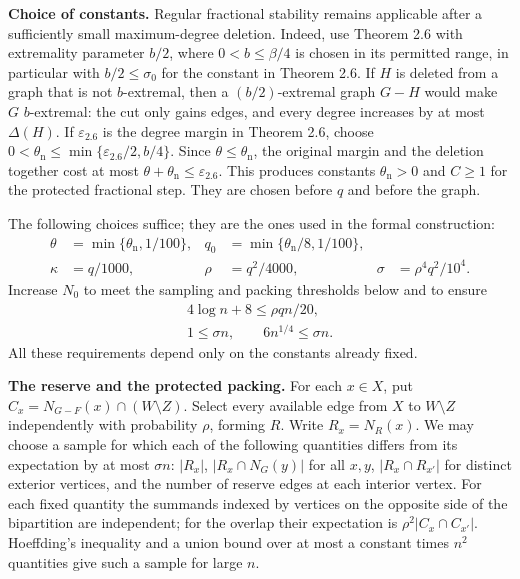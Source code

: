\documentclass[english,11pt,a4paper]{article}
\begin{document}
\textbf{Choice of constants.} Regular fractional stability remains applicable after a sufficiently small maximum-degree deletion. Indeed, use Theorem 2.6 with extremality parameter \(b/2\), where \(0<b\le\beta/4\) is chosen in its permitted range, in particular with \(b/2\le\sigma_0\) for the constant in Theorem 2.6. If \(H\) is deleted from a graph that is not \(b\)-extremal, then a \((b/2)\)-extremal graph \(G-H\) would make \(G\) \(b\)-extremal: the cut only gains edges, and every degree increases by at most \(\Delta(H)\). If \(\varepsilon_{2.6}\) is the degree margin in Theorem 2.6, choose \(0<\theta_{\mathrm n}\le\min\{\varepsilon_{2.6}/2,b/4\}\). Since \(\theta\le\theta_{\mathrm n}\), the original margin and the deletion together cost at most \(\theta+\theta_{\mathrm n}\le\varepsilon_{2.6}\). This produces constants \(\theta_{\mathrm n}>0\) and \(C\ge1\) for the protected fractional step. They are chosen before \(q\) and before the graph.

The following choices suffice; they are the ones used in the formal construction: \[\begin{aligned}
\theta&=\min\{\theta_{\mathrm n},1/100\},&
q_0&=\min\{\theta_{\mathrm n}/8,1/100\},\\
\kappa&=q/1000,&
\rho&=q^2/4000,&
\sigma&=\rho^4q^2/10^4.
\end{aligned}\] Increase \(N_0\) to meet the sampling and packing thresholds below and to ensure \[\begin{gathered}
4\log n+8\le\rho qn/20,\\
1\le\sigma n,\qquad 6n^{1/4}\le\sigma n.
\end{gathered}\] All these requirements depend only on the constants already fixed.

\textbf{The reserve and the protected packing.} For each \(x\in X\), put \(C_x=N_{G-F}(x)\cap(W\setminus Z)\). Select every available edge from \(X\) to \(W\setminus Z\) independently with probability \(\rho\), forming \(R\). Write \(R_x=N_R(x)\). We may choose a sample for which each of the following quantities differs from its expectation by at most \(\sigma n\): \(|R_x|\), \(|R_x\cap N_G(y)|\) for all \(x,y\), \(|R_x\cap R_{x'}|\) for distinct exterior vertices, and the number of reserve edges at each interior vertex. For each fixed quantity the summands indexed by vertices on the opposite side of the bipartition are independent; for the overlap their expectation is \(\rho^2|C_x\cap C_{x'}|\). Hoeffding's inequality and a union bound over at most a constant times \(n^2\) quantities give such a sample for large \(n\).
\end{document}
